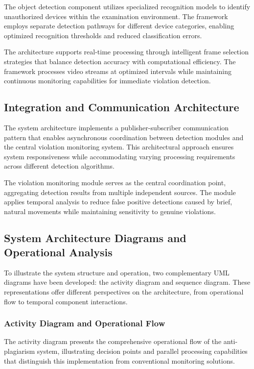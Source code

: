 \documentclass[conference]{IEEEtran}
\begin{document}
The object detection component utilizes specialized recognition models to identify unauthorized 
devices within the examination environment. The framework employs separate detection pathways 
for different device categories, enabling optimized recognition thresholds and reduced 
classification errors.

The architecture supports real-time processing through intelligent frame selection strategies 
that balance detection accuracy with computational efficiency. The framework processes video 
streams at optimized intervals while maintaining continuous monitoring capabilities for 
immediate violation detection.

\subsection{Integration and Communication Architecture}

The system architecture implements a publisher-subscriber communication pattern that enables 
asynchronous coordination between detection modules and the central violation monitoring 
system. This architectural approach ensures system responsiveness while accommodating 
varying processing requirements across different detection algorithms.

The violation monitoring module serves as the central coordination point, aggregating 
detection results from multiple independent sources. The module applies temporal analysis 
to reduce false positive detections caused by brief, natural movements while maintaining 
sensitivity to genuine violations.

\subsection{System Architecture Diagrams and Operational Analysis}

To illustrate the system structure and operation, two complementary UML diagrams have been developed: the activity diagram and sequence diagram. These representations offer different perspectives on the architecture, from operational flow to temporal component interactions.

\subsubsection{Activity Diagram and Operational Flow}

The activity diagram presents the comprehensive operational flow of the anti-plagiarism system, illustrating decision points and parallel processing capabilities that distinguish this implementation from conventional monitoring solutions.
\end{document}
